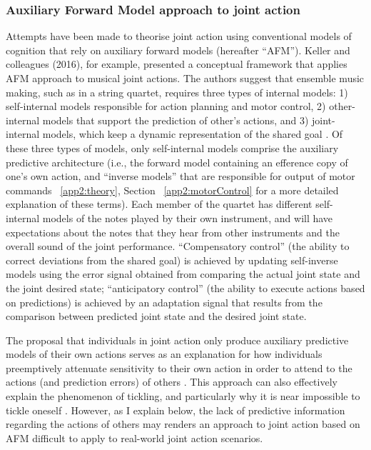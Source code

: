 \begin{CJK}{UTF8}{gbsn}
\subsubsection{Auxiliary Forward Model approach to joint action}
Attempts have been made to theorise joint action using conventional models of cognition that rely on auxiliary forward models (hereafter ``AFM'').  Keller and colleagues (2016), for example, presented a conceptual framework that applies AFM approach to musical joint actions.  The authors suggest that ensemble music making, such as in a string quartet, requires three types of internal models: 1) self-internal models responsible for action planning and motor control, 2) other-internal models that support the prediction of other’s actions, and 3) joint-internal models, which keep a dynamic representation of the shared goal \citep{Keller2016}.  Of these three types of models, only self-internal models comprise the auxiliary predictive architecture (i.e., the forward model containing an efference copy of one's own action, and ``inverse models'' that are responsible for output of motor commands ~\ref{app2:theory}, Section ~\ref{app2:motorControl} for a more detailed explanation of these terms).  Each member of the quartet has different self-internal models of the notes played by their own instrument, and will have expectations about the notes that they hear from other instruments and the overall sound of the joint performance.  ``Compensatory control'' (the ability to correct deviations from the shared goal) is achieved by updating self-inverse models using the error signal obtained from comparing the actual joint state and the joint desired state; ``anticipatory control'' (the ability to execute actions based on predictions) is achieved by an adaptation signal that results from the comparison between predicted joint state and the desired joint state.

The proposal that individuals in joint action only produce auxiliary predictive models of their own actions serves as an explanation for how individuals preemptively attenuate sensitivity to their own action in order to attend to the actions (and prediction errors) of others \citep{}.  This approach can also effectively explain the phenomenon of tickling, and particularly why it is near impossible to tickle oneself \citep[due to sensory attenuation resulting from the self-generated predictions about the consequences of action][]{Blakemore2003}.  However, as I explain below, the lack of predictive information regarding the actions of others may renders an approach to joint action based on AFM difficult to apply to real-world joint action scenarios.


\end{CJK}
